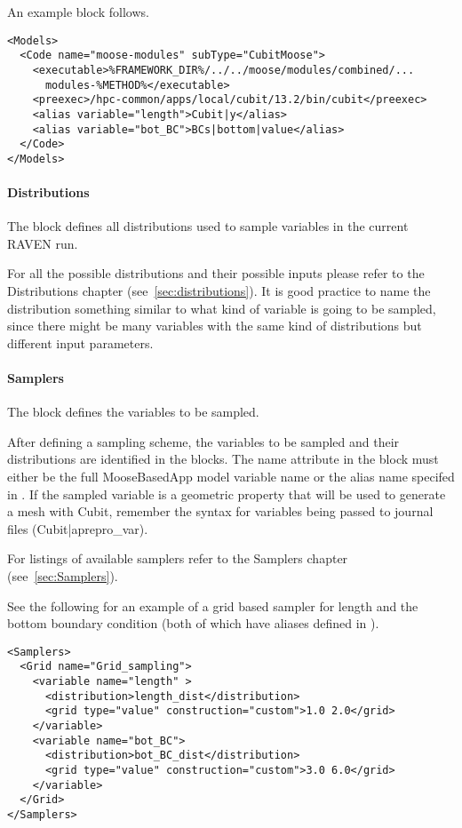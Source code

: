 An example  block follows.

\begin{lstlisting}[style=XML]
<Models>
  <Code name="moose-modules" subType="CubitMoose">
    <executable>%FRAMEWORK_DIR%/../../moose/modules/combined/...
      modules-%METHOD%</executable>
    <preexec>/hpc-common/apps/local/cubit/13.2/bin/cubit</preexec>
    <alias variable="length">Cubit|y</alias>
    <alias variable="bot_BC">BCs|bottom|value</alias>
  </Code>
</Models>
\end{lstlisting}

\paragraph{Distributions}
The  block defines all distributions used to 
sample variables in the current RAVEN run.  

For all the possible distributions and their possible inputs please 
refer to the Distributions chapter (see~\ref{sec:distributions}).
%
It is good practice to name the distribution something similar to what kind of
variable is going to be sampled, since there might be many variables with the
same kind of distributions but different input parameters.

\paragraph{Samplers}
The  block defines the variables to be sampled.

After defining a sampling scheme, the variables to be sampled and 
their distributions are identified in the  blocks.
The name attribute in the  block must either be the 
full MooseBasedApp model variable name or the alias name specifed in 
.  If the sampled variable is a geometric property 
that will be used to generate a mesh with Cubit, remember the syntax for 
variables being passed to journal files (Cubit|aprepro\_var).

For listings of available samplers 
refer to the Samplers chapter (see~\ref{sec:Samplers}).

See the following for an example of a grid based sampler for 
length and the bottom boundary condition (both of which have aliases
defined in ).

\begin{lstlisting}[style=XML]
<Samplers>
  <Grid name="Grid_sampling">
    <variable name="length" >
      <distribution>length_dist</distribution>
      <grid type="value" construction="custom">1.0 2.0</grid>
    </variable>
    <variable name="bot_BC">
      <distribution>bot_BC_dist</distribution>
      <grid type="value" construction="custom">3.0 6.0</grid>
    </variable>
  </Grid>
</Samplers>
\end{lstlisting}

